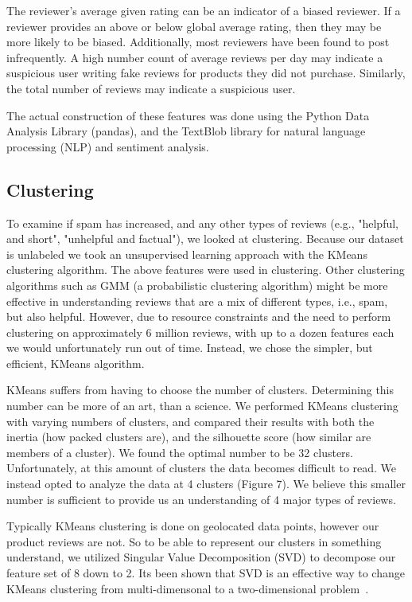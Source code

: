 \documentclass[journal, a4paper]{IEEEtran}
\begin{document}
The reviewer's average given rating can be an indicator of a biased reviewer. If a reviewer provides an above or below global average rating, then they may be more likely to be biased. Additionally, most reviewers have been found to post infrequently. A high number count of average reviews per day may indicate a suspicious user writing fake reviews for products they did not purchase. Similarly, the total number of reviews may indicate a suspicious user.

The actual construction of these features was done using the Python Data Analysis Library (pandas), and the TextBlob library for natural language processing (NLP) and sentiment analysis.

\subsection{Clustering}

To examine if spam has increased, and any other types of reviews (e.g., "helpful, and short", "unhelpful and factual"), we looked at clustering. Because our dataset is unlabeled we took an unsupervised learning approach with the KMeans clustering algorithm. The above features were used in clustering. Other clustering algorithms such as GMM (a probabilistic clustering algorithm) might be more effective in understanding reviews that are a mix of different types, i.e., spam, but also helpful. However, due to resource constraints and the need to perform clustering on approximately 6 million reviews, with up to a dozen features each we would unfortunately run out of time. Instead, we chose the simpler, but efficient, KMeans algorithm.

KMeans suffers from having to choose the number of clusters. Determining this number can be more of an art, than a science. We performed KMeans clustering with varying numbers of clusters, and compared their results with both the inertia (how packed clusters are), and the silhouette score (how similar are members of a cluster). We found the optimal number to be 32 clusters. Unfortunately, at this amount of clusters the data becomes difficult to read. We instead opted to analyze the data at 4 clusters (Figure 7). We believe this smaller number is sufficient to provide us an understanding of 4 major types of reviews.

Typically KMeans clustering is done on geolocated data points, however our product reviews are not. So to be able to represent our clusters in something understand, we utilized Singular Value Decomposition (SVD) to decompose our feature set of 8 down to 2. Its been shown that SVD is an effective way to change KMeans clustering from multi-dimensonal to a two-dimensional problem~\cite{9}.
\end{document}
